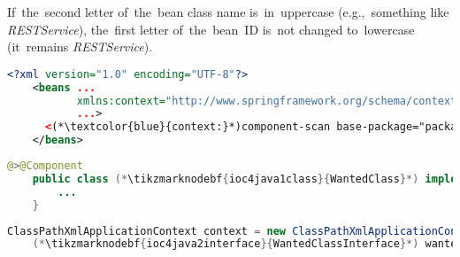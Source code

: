 \warning If~the~second letter of~the~bean class name is~in~uppercase (e.g.,~something like \textit{\mbox{RESTService}}), the~first letter of~the~bean~ID is~not changed to~lowercase (it~remains \textit{\mbox{RESTService}}).

\example
\begin{lstlisting}[language=XML, title={Configuration XML}]
    <?xml version="1.0" encoding="UTF-8"?>
    <beans ...
           xmlns:context="http://www.springframework.org/schema/context"
           ...>
      <(*\textcolor{blue}{context:}*)component-scan base-package="package.subfolder"/>
    </beans>
\end{lstlisting}
\begin{lstlisting}[language=Java, title={Wanted class}]
    @>@Component
    public class (*\tikzmarknodebf{ioc4java1class}{WantedClass}*) implements (*\tikzmarknodebf{ioc4java1interface}{WantedClassInterface}*) {
        ...
    }
\end{lstlisting}
\begin{lstlisting}[language=Java, title={Usage}]
    ClassPathXmlApplicationContext context = new ClassPathXmlApplicationContext("configurationFile.xml");
    (*\tikzmarknodebf{ioc4java2interface}{WantedClassInterface}*) wantedClassInstance = context.getBean("(*\tikzmarknodebf{ioc4java2beanid}{wantedClass}[ForestGreen]*)", (*\tikzmarknodebf{ioc4java2interface2}{WantedClassInterface}*).class);
\end{lstlisting}
